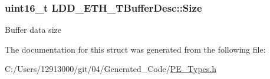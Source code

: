 \subsubsection[{Size}]{\setlength{\rightskip}{0pt plus 5cm}uint16\+\_\+t L\+D\+D\+\_\+\+E\+T\+H\+\_\+\+T\+Buffer\+Desc\+::\+Size}\label{struct_l_d_d___e_t_h___t_buffer_desc_abddc4273b732d3cf44ff0b6870d6b87a}
Buffer data size 

The documentation for this struct was generated from the following file\+:\begin{DoxyCompactItemize}
\item 
C\+:/\+Users/12913000/git/04/\+Generated\+\_\+\+Code/\hyperlink{_p_e___types_8h}{P\+E\+\_\+\+Types.\+h}\end{DoxyCompactItemize}
